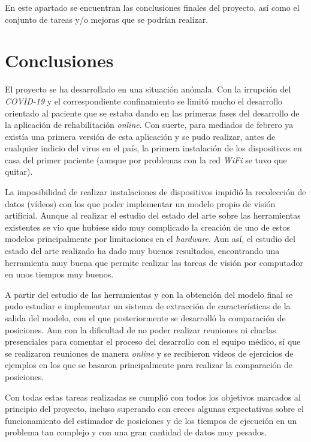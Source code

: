 
En este apartado se encuentran las conclusiones finales del proyecto, así como el conjunto de tareas y/o mejoras que se podrían realizar.

\section{Conclusiones}
El proyecto se ha desarrollado en una situación anómala. Con la irrupción del \textit{COVID-19} y el correspondiente confinamiento se limitó mucho el desarrollo orientado al paciente que se estaba dando en las primeras fases del desarrollo de la aplicación de rehabilitación \textit{online}. Con suerte, para mediados de febrero ya existía una primera versión de esta aplicación y se pudo realizar, antes de cualquier indicio del virus en el país, la primera instalación de los dispositivos en casa del primer paciente (aunque por problemas con la red \textit{WiFi} se tuvo que quitar).

La imposibilidad de realizar instalaciones de dispositivos impidió la recolección de datos (vídeos) con los que poder implementar un modelo propio de visión artificial. Aunque al realizar el estudio del estado del arte sobre las herramientas existentes se vio que hubiese sido muy complicado la creación de uno de estos modelos principalmente por limitaciones en el \textit{hardware}. Aun así, el estudio del estado del arte realizado ha dado muy buenos resultados, encontrando una herramienta muy buena que permite realizar las tareas de visión por computador en unos tiempos muy buenos.

A partir del estudio de las herramientas y con la obtención del modelo final se pudo estudiar e implementar un sistema de extracción de características de la salida del modelo, con el que posteriormente se desarrolló la comparación de posiciones. Aun con la dificultad de no poder realizar reuniones ni charlas presenciales para comentar el proceso del desarrollo con el equipo médico, sí que se realizaron reuniones de manera \textit{online} y se recibieron vídeos de ejercicios de ejemplos en los que se basaron principalmente para realizar la comparación de posiciones. 

Con todas estas tareas realizadas se cumplió con todos los objetivos marcados al principio del proyecto, incluso superando con creces algunas expectativas sobre el funcionamiento del estimador de posiciones y de los tiempos de ejecución en un problema tan complejo y con una gran cantidad de datos muy pesados.

